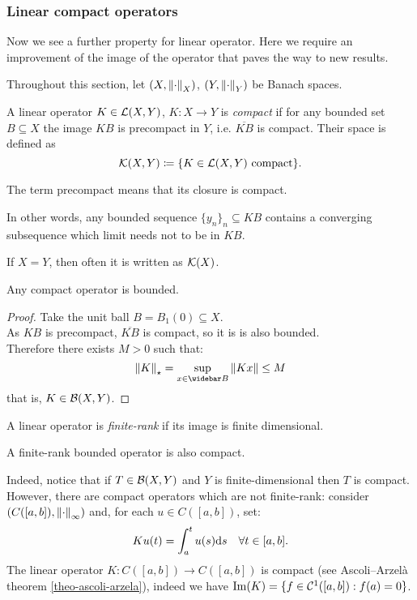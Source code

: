 \subsubsection{Linear compact operators}
Now we see a further property for linear operator. Here we require an improvement of the image of the operator that paves the way to new results.

Throughout this section, let $(X, \left\lVert\cdot\right\rVert_X)$, $(Y, \left\lVert\cdot\right\rVert_Y)$ be Banach spaces.
\begin{defn}
	A linear operator $K \in \mathcal L(X,Y)$, $K:X \to Y$ is \emph{compact} if for any bounded set $B \subseteq X$ the image $KB$ is precompact in $Y$, i.e. $\overline{KB}$ is compact.
	Their space is defined as $$\mathcal K(X,Y) \coloneqq \{ K \in \mathcal L(X,Y) \text{ compact} \}.$$
\end{defn}

The term precompact means that its closure is compact.

In other words, any bounded sequence $\{y_n\}_n \subseteq KB$ contains a converging subsequence which limit needs not to be in $KB$.

If $X=Y$, then often it is written as $\mathcal K(X)$.

\begin{prop}
	Any compact operator is bounded.
	\label{prop-compact-bdd}
\end{prop}
\begin{proof}
	Take the unit ball $B = B_1(0) \subseteq X$.\\
	As $KB$ is precompact, $\overline{KB}$ is compact, so it is is also bounded.\\
	Therefore there exists $M > 0$ such that:
	$$
		\norm K_\star 
		= \sup\limits_{x \in \widebar B} \norm{Kx} 
		\le M
	$$ 
	that is, $K \in \mathcal B(X,Y)$.
\end{proof}

\begin{defn}
	A linear operator is \emph{finite-rank} if its image is finite dimensional. 
\end{defn}

\begin{prop}
	A finite-rank bounded operator is also compact. 	
\end{prop}
Indeed, notice that if $T \in \mathcal B(X,Y)$ and $Y$ is finite-dimensional then $T$ is compact.\\
However, there are compact operators which are not finite-rank: consider $(C([a,b]), \left\lVert\cdot\right\rVert_\infty)$ and, for each $u \in C([a,b])$, set:
$$Ku(t) = \int_a^t u(s) \mathrm d s \quad \forall t \in [a,b].$$
The linear operator $K: C([a,b]) \to C([a,b])$ is compact (see Ascoli--Arzelà theorem \vref{theo-ascoli-arzela}), indeed we have $\operatorname{Im}(K)=\{f \in \mathcal C^1([a,b]): f(a) = 0\}$.

